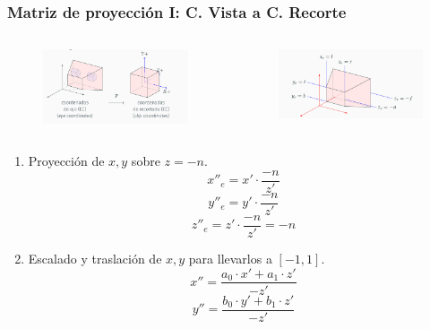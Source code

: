 \documentclass[pdf]{beamer}
\begin{document}
\begin{frame}
	\frametitle{Matriz de proyección I: C. Vista a C. Recorte}
	\begin{columns}
		\begin{figure}
			\centering
			\includegraphics[width=\textwidth]{cubo}
		\end{figure}
	
			\begin{figure}
			\centering
			\includegraphics[width=\textwidth]{notacion}
		\end{figure}
	\end{columns}
	\begin{multicols}{2}
		
		\begin{enumerate}
		
			\item Proyección de $x,y$ sobre $z = -n$.
			\begin{equation*}
				x''_e = x'\cdot\frac{-n}{z'}
			\end{equation*}
			\begin{equation*}
				y''_e = y'\cdot\frac{-n}{z'}
			\end{equation*}
			\begin{equation*}
				z''_e = z'\cdot\frac{-n}{z'} = -n
			\end{equation*}
	
			\item Escalado y traslación de $x,y$ para llevarlos a $[-1,1]$.
			\begin{equation*}
				x'' =  \frac{a_0 \cdot x'+a_1 \cdot z'}{-z'}
			\end{equation*}
			\begin{equation*}
				y'' =  \frac{b_0 \cdot y'+b_1 \cdot z'}{-z'}
			\end{equation*}
		\end{enumerate}
	\end{multicols}
\end{frame}
\end{document}
